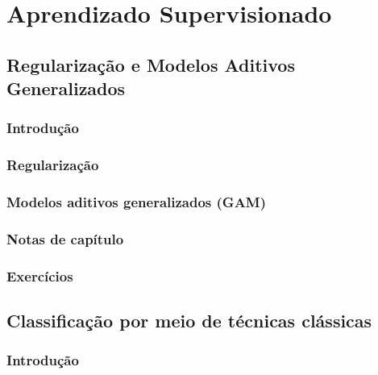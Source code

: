 \documentclass[
]{latex/krantz}
\theoremstyle{definition}
\theoremstyle{definition}
\theoremstyle{definition}
\theoremstyle{definition}
\theoremstyle{remark}
\begin{document}
\hypertarget{part-aprendizado-supervisionado}{%
\part{Aprendizado Supervisionado}\label{part-aprendizado-supervisionado}}

\hypertarget{regularizauxe7uxe3o-e-modelos-aditivos-generalizados}{%
\chapter{Regularização e Modelos Aditivos Generalizados}\label{regularizauxe7uxe3o-e-modelos-aditivos-generalizados}}

\hypertarget{introduuxe7uxe3o-6}{%
\section{Introdução}\label{introduuxe7uxe3o-6}}

\hypertarget{regularizauxe7uxe3o}{%
\section{Regularização}\label{regularizauxe7uxe3o}}

\hypertarget{modelos-aditivos-generalizados-gam}{%
\section{Modelos aditivos generalizados (GAM)}\label{modelos-aditivos-generalizados-gam}}

\hypertarget{notas-de-capuxedtulo-6}{%
\section{Notas de capítulo}\label{notas-de-capuxedtulo-6}}

\hypertarget{exercuxedcios-6}{%
\section{Exercícios}\label{exercuxedcios-6}}

\hypertarget{classificauxe7uxe3o-por-meio-de-tuxe9cnicas-cluxe1ssicas}{%
\chapter{Classificação por meio de técnicas clássicas}\label{classificauxe7uxe3o-por-meio-de-tuxe9cnicas-cluxe1ssicas}}

\hypertarget{introduuxe7uxe3o-7}{%
\section{Introdução}\label{introduuxe7uxe3o-7}}
\end{document}
